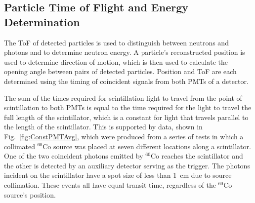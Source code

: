 \subsection{Particle Time of Flight and Energy Determination}
\label{ToF_reconstruction}
The ToF of detected particles is used to distinguish between neutrons and photons and to determine neutron energy.
A particle's reconstructed position is used to determine direction of motion, which is then used to calculate the opening angle between pairs of detected particles.
Position and ToF are each determined using the timing of coincident signals from both PMTs of a detector.

The sum of the times required for scintillation light to travel from the point of scintillation to both PMTs is equal to the time required for the light to travel the full length of the scintillator, which is a constant for light that travels parallel to the length of the scintillator.
This is supported by data, shown in Fig.~\ref{fig:ConstPMTAvg}, which were produced from a series of tests in which a collimated $^{60}$Co source was placed at seven different locations along a scintillator.
One of the two coincident photons emitted by $^{60}$Co reaches the scintillator and the other is detected by an auxiliary detector serving as the trigger. 
The photons incident on the scintillator have a spot size of less than 1~cm due to source collimation.
These events all have equal transit time, regardless of the $^{60}$Co source's position. %

